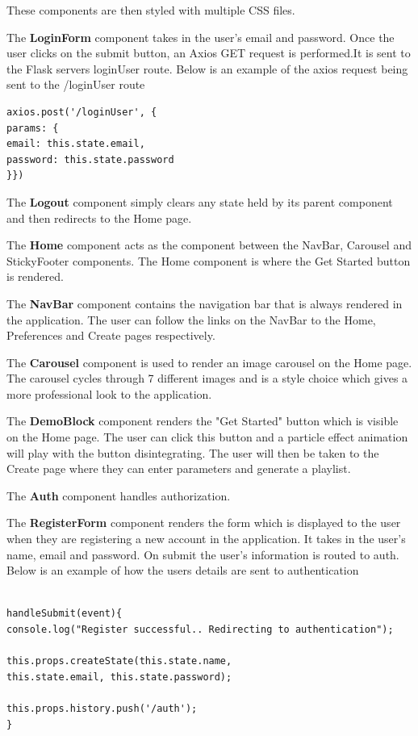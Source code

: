 These components are then styled with multiple CSS files.\newline


The \textbf{LoginForm} component takes in the user’s email and password. Once the user clicks on the submit button, an Axios GET request is performed.It is sent to the Flask servers loginUser route.\newline
Below is an example of the axios request being sent to the /loginUser route\newline
\begin{verbatim} 
axios.post('/loginUser', {
params: {
email: this.state.email,
password: this.state.password
}})
\end{verbatim}

The \textbf{Logout} component simply clears any state held by its parent component and then redirects to the Home page.\newline

The \textbf{Home} component acts as the component between the NavBar, Carousel and StickyFooter components. The Home component is where the Get Started button is rendered.\newline

The \textbf{NavBar} component contains the navigation bar that is always rendered in the application. The user can follow the links on the NavBar to the Home, Preferences and Create pages respectively.\newline

The \textbf{Carousel} component is used to render an image carousel on the Home page. The carousel cycles through 7 different images and is a style choice which gives a more professional look to the application.\newline

The \textbf{DemoBlock} component renders the "Get Started" button which is visible on the Home page. The user can click this button and a particle effect animation will play with the button disintegrating. The user will then be taken to the Create page where they can enter parameters and generate a playlist.

The \textbf{Auth} component handles authorization.\newline

The \textbf{RegisterForm} component renders the form which is displayed to the user when they are registering a new account in the application. It takes in the user’s name, email and password. On submit the user’s information is routed to auth.\newline
Below is an example of how the users details are sent to authentication\newline
\begin{verbatim} 

handleSubmit(event){
console.log("Register successful.. Redirecting to authentication");

this.props.createState(this.state.name,
this.state.email, this.state.password);
		
this.props.history.push('/auth');
}
\end{verbatim}



